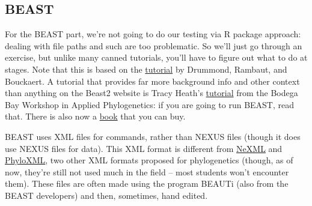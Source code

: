 \documentclass[
]{article}
\begin{document}
\hypertarget{beast}{%
\subsection{BEAST}\label{beast}}

For the BEAST part, we're not going to do our testing via R package approach: dealing with file paths and such are too problematic. So we'll just go through an exercise, but unlike many canned tutorials, you'll have to figure out what to do at stages. Note that this is based on the \href{https://github.com/CompEvol/beast2/blob/master/doc/tutorials/DivergenceDating/DivergenceDatingTutorialv2.0.3.pdf?raw=true}{tutorial} by Drummond, Rambaut, and Bouckaert. A tutorial that provides far more background info and other context than anything on the Beast2 website is Tracy Heath's \href{http://phyloworks.org/workshops/DivTime_BEAST2_tutorial_FBD.pdf}{tutorial} from the Bodega Bay Workshop in Applied Phylogenetics: if you are going to run BEAST, read that. There is also now a \href{http://beast2.org/book/}{book} that you can buy.

BEAST uses XML files for commands, rather than NEXUS files (though it does use NEXUS files for data). This XML format is different from \href{http://www.nexml.org}{NeXML} and \href{http://www.phyloxml.org}{PhyloXML}, two other XML formats proposed for phylogenetics (though, as of now, they're still not used much in the field -- most students won't encounter them). These files are often made using the program BEAUTi (also from the BEAST developers) and then, sometimes, hand edited.
\end{document}
